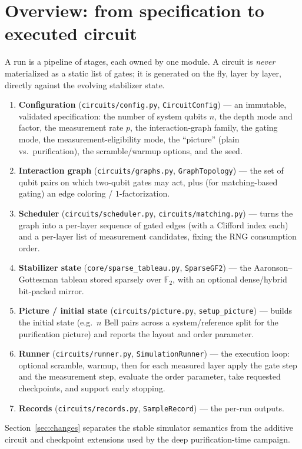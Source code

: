 \documentclass[11pt]{article}
\newcommand{\F}{\mathbb{F}}
\newcommand{\code}[1]{\texttt{#1}}
\newcommand{\file}[1]{\texttt{#1}}
\begin{document}
\section{Overview: from specification to executed circuit}
\label{sec:overview}
A run is a pipeline of stages, each owned by one module. A circuit is \emph{never} materialized as a static list
of gates; it is generated on the fly, layer by layer, directly against the evolving stabilizer state.
\begin{enumerate}[itemsep=2pt]
\item \textbf{Configuration} (\file{circuits/config.py}, \code{CircuitConfig}) --- an immutable, validated
specification: the number of system qubits $n$, the depth mode and factor, the measurement rate $p$, the
interaction-graph family, the gating mode, the measurement-eligibility mode, the ``picture'' (plain vs.\
purification), the scramble/warmup options, and the seed.
\item \textbf{Interaction graph} (\file{circuits/graphs.py}, \code{GraphTopology}) --- the set of qubit pairs on
which two-qubit gates may act, plus (for matching-based gating) an edge coloring / $1$-factorization.
\item \textbf{Scheduler} (\file{circuits/scheduler.py}, \file{circuits/matching.py}) --- turns the graph into a
per-layer sequence of gated edges (with a Clifford index each) and a per-layer list of measurement candidates,
fixing the RNG consumption order.
\item \textbf{Stabilizer state} (\file{core/sparse\_tableau.py}, \code{SparseGF2}) --- the Aaronson--Gottesman
tableau stored sparsely over $\F_2$, with an optional dense/hybrid bit-packed mirror.
\item \textbf{Picture / initial state} (\file{circuits/picture.py}, \code{setup\_picture}) --- builds the initial
state (e.g.\ $n$ Bell pairs across a system/reference split for the purification picture) and reports the layout
and order parameter.
\item \textbf{Runner} (\file{circuits/runner.py}, \code{SimulationRunner}) --- the execution loop: optional
scramble, warmup, then for each measured layer apply the gate step and the measurement step, evaluate the
order parameter, take requested checkpoints, and support early stopping.
\item \textbf{Records} (\file{circuits/records.py}, \code{SampleRecord}) --- the per-run outputs.
\end{enumerate}
Section~\ref{sec:changes} separates the stable simulator semantics from the additive circuit and checkpoint
extensions used by the deep purification-time campaign.
\end{document}
